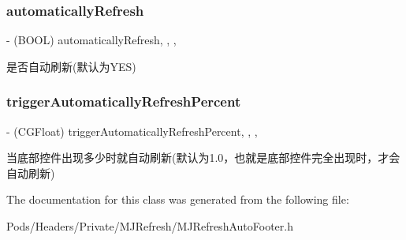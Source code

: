 \subsubsection{\texorpdfstring{automatically\+Refresh}{automaticallyRefresh}}
{\footnotesize\ttfamily -\/ (B\+O\+OL) automatically\+Refresh\hspace{0.3cm}{\ttfamily [read]}, {\ttfamily [write]}, {\ttfamily [nonatomic]}, {\ttfamily [assign]}}

是否自动刷新(默认为\+Y\+ES) \mbox{\label{interface_m_j_refresh_auto_footer_acb5016ce672ae89612fc64d1882ef26b}} 
\subsubsection{\texorpdfstring{trigger\+Automatically\+Refresh\+Percent}{triggerAutomaticallyRefreshPercent}}
{\footnotesize\ttfamily -\/ (C\+G\+Float) trigger\+Automatically\+Refresh\+Percent\hspace{0.3cm}{\ttfamily [read]}, {\ttfamily [write]}, {\ttfamily [nonatomic]}, {\ttfamily [assign]}}

当底部控件出现多少时就自动刷新(默认为1.0，也就是底部控件完全出现时，才会自动刷新) 

The documentation for this class was generated from the following file\+:\begin{DoxyCompactItemize}
\item 
Pods/\+Headers/\+Private/\+M\+J\+Refresh/M\+J\+Refresh\+Auto\+Footer.\+h\end{DoxyCompactItemize}
